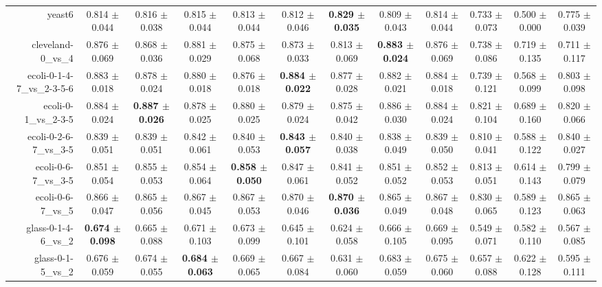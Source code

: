 \begin{table}[!ht]
{\begin{tabular}{r c c c c c c c c c c c}
yeast6 & 0.814 $\pm$ 0.044 & 0.816 $\pm$ 0.038 & 0.815 $\pm$ 0.044 & 0.813 $\pm$ 0.044 & 0.812 $\pm$ 0.046 & \textbf{0.829 $\pm$ 0.035} & 0.809 $\pm$ 0.043 & 0.814 $\pm$ 0.044 & 0.733 $\pm$ 0.073 & 0.500 $\pm$ 0.000 & 0.775 $\pm$ 0.039 \\
cleveland-0\_vs\_4 & 0.876 $\pm$ 0.069 & 0.868 $\pm$ 0.036 & 0.881 $\pm$ 0.029 & 0.875 $\pm$ 0.068 & 0.873 $\pm$ 0.033 & 0.813 $\pm$ 0.069 & \textbf{0.883 $\pm$ 0.024} & 0.876 $\pm$ 0.069 & 0.738 $\pm$ 0.086 & 0.719 $\pm$ 0.135 & 0.711 $\pm$ 0.117 \\
ecoli-0-1-4-7\_vs\_2-3-5-6 & 0.883 $\pm$ 0.018 & 0.878 $\pm$ 0.024 & 0.880 $\pm$ 0.018 & 0.876 $\pm$ 0.018 & \textbf{0.884 $\pm$ 0.022} & 0.877 $\pm$ 0.028 & 0.882 $\pm$ 0.021 & 0.884 $\pm$ 0.018 & 0.739 $\pm$ 0.121 & 0.568 $\pm$ 0.099 & 0.803 $\pm$ 0.098 \\
ecoli-0-1\_vs\_2-3-5 & 0.884 $\pm$ 0.024 & \textbf{0.887 $\pm$ 0.026} & 0.878 $\pm$ 0.025 & 0.880 $\pm$ 0.025 & 0.879 $\pm$ 0.024 & 0.875 $\pm$ 0.042 & 0.886 $\pm$ 0.030 & 0.884 $\pm$ 0.024 & 0.821 $\pm$ 0.104 & 0.689 $\pm$ 0.160 & 0.820 $\pm$ 0.066 \\
ecoli-0-2-6-7\_vs\_3-5 & 0.839 $\pm$ 0.051 & 0.839 $\pm$ 0.051 & 0.842 $\pm$ 0.061 & 0.840 $\pm$ 0.053 & \textbf{0.843 $\pm$ 0.057} & 0.840 $\pm$ 0.038 & 0.838 $\pm$ 0.049 & 0.839 $\pm$ 0.050 & 0.810 $\pm$ 0.041 & 0.588 $\pm$ 0.122 & 0.840 $\pm$ 0.027 \\
ecoli-0-6-7\_vs\_3-5 & 0.851 $\pm$ 0.054 & 0.855 $\pm$ 0.053 & 0.854 $\pm$ 0.064 & \textbf{0.858 $\pm$ 0.050} & 0.847 $\pm$ 0.061 & 0.841 $\pm$ 0.052 & 0.851 $\pm$ 0.052 & 0.852 $\pm$ 0.053 & 0.813 $\pm$ 0.051 & 0.614 $\pm$ 0.143 & 0.799 $\pm$ 0.079 \\
ecoli-0-6-7\_vs\_5 & 0.866 $\pm$ 0.047 & 0.865 $\pm$ 0.056 & 0.867 $\pm$ 0.045 & 0.867 $\pm$ 0.053 & 0.870 $\pm$ 0.046 & \textbf{0.870 $\pm$ 0.036} & 0.865 $\pm$ 0.049 & 0.867 $\pm$ 0.048 & 0.830 $\pm$ 0.065 & 0.589 $\pm$ 0.123 & 0.865 $\pm$ 0.063 \\
glass-0-1-4-6\_vs\_2 & \textbf{0.674 $\pm$ 0.098} & 0.665 $\pm$ 0.088 & 0.671 $\pm$ 0.103 & 0.673 $\pm$ 0.099 & 0.645 $\pm$ 0.101 & 0.624 $\pm$ 0.058 & 0.666 $\pm$ 0.105 & 0.669 $\pm$ 0.095 & 0.549 $\pm$ 0.071 & 0.582 $\pm$ 0.110 & 0.567 $\pm$ 0.085 \\
glass-0-1-5\_vs\_2 & 0.676 $\pm$ 0.059 & 0.674 $\pm$ 0.055 & \textbf{0.684 $\pm$ 0.063} & 0.669 $\pm$ 0.065 & 0.667 $\pm$ 0.084 & 0.631 $\pm$ 0.060 & 0.683 $\pm$ 0.059 & 0.675 $\pm$ 0.060 & 0.657 $\pm$ 0.088 & 0.622 $\pm$ 0.128 & 0.595 $\pm$ 0.111 \\

\end{tabular}}
\end{table}
